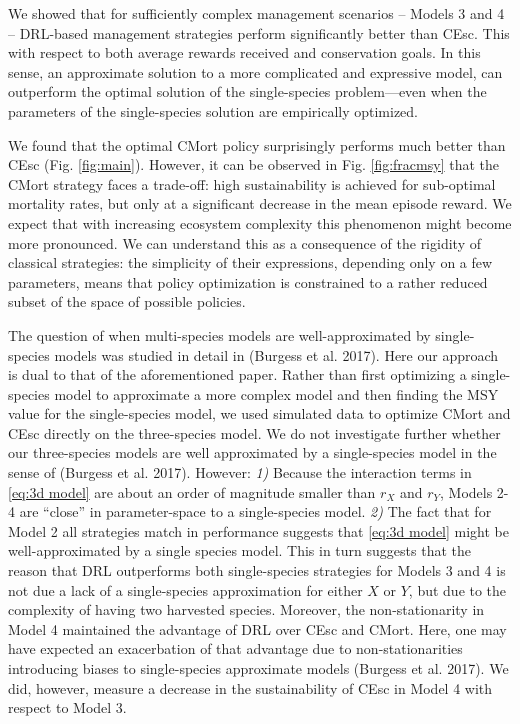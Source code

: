 \documentclass{article}
\begin{document}
We showed that for sufficiently complex management scenarios -- Models 3
and 4 -- DRL-based management strategies perform significantly better
than CEsc. This with respect to both average rewards received and
conservation goals. In this sense, an approximate solution to a more
complicated and expressive model, can outperform the optimal solution of
the single-species problem---even when the parameters of the
single-species solution are empirically optimized.

We found that the optimal CMort policy surprisingly performs much better
than CEsc (Fig. \ref{fig:main}). However, it can be observed in Fig.
\ref{fig:fracmsy} that the CMort strategy faces a trade-off: high
sustainability is achieved for sub-optimal mortality rates, but only at
a significant decrease in the mean episode reward. We expect that with
increasing ecosystem complexity this phenomenon might become more
pronounced. We can understand this as a consequence of the rigidity of
classical strategies: the simplicity of their expressions, depending
only on a few parameters, means that policy optimization is constrained
to a rather reduced subset of the space of possible policies.

The question of when multi-species models are well-approximated by
single-species models was studied in detail in (Burgess et al. 2017).
Here our approach is dual to that of the aforementioned paper. Rather
than first optimizing a single-species model to approximate a more
complex model and then finding the MSY value for the single-species
model, we used simulated data to optimize CMort and CEsc directly on the
three-species model. We do not investigate further whether our
three-species models are well approximated by a single-species model in
the sense of (Burgess et al. 2017). However: \emph{1)} Because the
interaction terms in \eqref{eq:3d model} are about an order of magnitude
smaller than \(r_X\) and \(r_Y\), Models 2-4 are ``close'' in
parameter-space to a single-species model. \emph{2)} The fact that for
Model 2 all strategies match in performance suggests that
\eqref{eq:3d model} might be well-approximated by a single species
model. This in turn suggests that the reason that DRL outperforms both
single-species strategies for Models 3 and 4 is not due a lack of a
single-species approximation for either \(X\) or \(Y\), but due to the
complexity of having two harvested species. Moreover, the
non-stationarity in Model 4 maintained the advantage of DRL over CEsc
and CMort. Here, one may have expected an exacerbation of that advantage
due to non-stationarities introducing biases to single-species
approximate models (Burgess et al. 2017). We did, however, measure a
decrease in the sustainability of CEsc in Model 4 with respect to Model
3.
\end{document}
